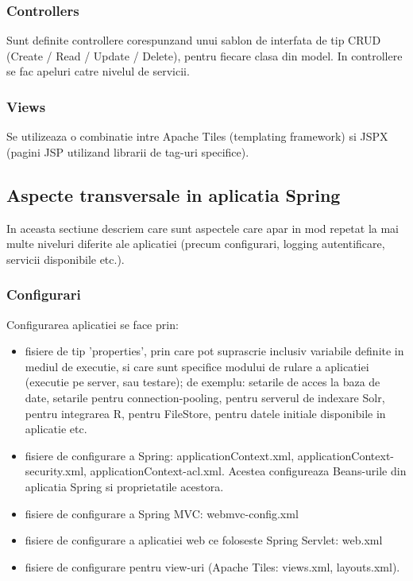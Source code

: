 \subsubsection{Controllers}
Sunt definite controllere corespunzand unui sablon de interfata de tip CRUD
(Create / Read / Update / Delete), pentru fiecare clasa din model. In
controllere se fac apeluri catre nivelul de servicii.

\subsubsection{Views}
Se utilizeaza o combinatie intre Apache Tiles (templating framework) si JSPX
(pagini JSP utilizand librarii de tag-uri specifice).

\subsection{Aspecte transversale in aplicatia Spring}
In aceasta sectiune descriem care sunt aspectele care apar in mod repetat la mai
multe niveluri diferite ale aplicatiei (precum configurari, logging
autentificare, servicii disponibile etc.).

\subsubsection{Configurari}
Configurarea aplicatiei se face prin:
\begin {itemize}
  \item fisiere de tip 'properties', prin care pot suprascrie
inclusiv variabile definite in mediul de executie, si care sunt specifice modului de rulare a
aplicatiei (executie pe server, sau testare); de exemplu: setarile de acces la
baza de date, setarile pentru connection-pooling, pentru serverul de indexare
Solr, pentru integrarea R, pentru FileStore, pentru datele initiale disponibile
in aplicatie etc.
  \item fisiere de configurare a Spring: applicationContext.xml,
  applicationContext-security.xml, applicationContext-acl.xml. Acestea
  configureaza Beans-urile din aplicatia Spring si proprietatile acestora.
  \item fisiere de configurare a Spring MVC: webmvc-config.xml
  \item fisiere de configurare a aplicatiei web ce foloseste Spring Servlet:
  web.xml
  \item fisiere de configurare pentru view-uri (Apache Tiles: views.xml,
  layouts.xml).
\end{itemize}

